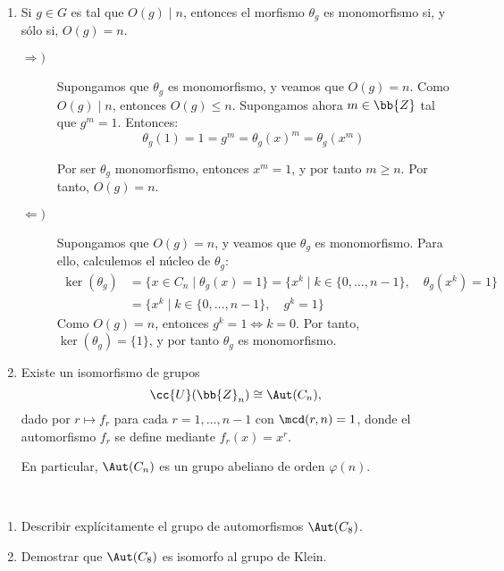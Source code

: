 \begin{ejercicio}
\begin{enumerate}
        \item Si $g \in G$ es tal que $O(g) \mid n$, entonces el morfismo $\theta_g$ es monomorfismo si, y sólo si, $O(g) = n$.
        \begin{description}
            \item[$\Longrightarrow)$] Supongamos que $\theta_g$ es monomorfismo, y veamos que $O(g)=n$. Como $O(g)\mid n$, entonces $O(g)\leq n$. Supongamos ahora $m\in \bb{Z}$ tal que $g^m=1$. Entonces:
            \begin{equation*}
                \theta_g(1)=1 =g^m=\theta_g(x)^m=\theta_g(x^m)
            \end{equation*}

            Por ser $\theta_g$ monomorfismo, entonces $x^m=1$, y por tanto $m\geq n$. Por tanto, $O(g)=n$.


            \item[$\Longleftarrow)$] Supongamos que $O(g)=n$, y veamos que $\theta_g$ es monomorfismo. Para ello, calculemos el núcleo de $\theta_g$:
            \begin{align*}
                \ker(\theta_g) &= \{x\in C_n\mid \theta_g(x)=1\}
                = \{x^k\mid k\in \{0,\ldots,n-1\},\quad \theta_g(x^k)=1\}\\
                &= \{x^k\mid k\in \{0,\ldots,n-1\},\quad g^k=1\}
            \end{align*}
            Como $O(g)=n$, entonces $g^k=1\iff k=0$. Por tanto, $\ker(\theta_g)=\{1\}$, y por tanto $\theta_g$ es monomorfismo.
        \end{description}
        
        \item Existe un isomorfismo de grupos
        \begin{equation*}
            \cc{U}(\bb{Z}_n) \cong \Aut(C_n),
        \end{equation*}
        dado por $r \mapsto f_r$ para cada $r = 1, \ldots, n-1$ con $\mcd(r, n) = 1$, donde el automorfismo $f_r$ se define mediante $f_r(x) = x^r$.

        En particular, $\Aut(C_n)$ es un grupo abeliano de orden $\varphi(n)$.


    \end{enumerate}
\end{ejercicio}

\begin{ejercicio}\label{ej:3.18}~
    \begin{enumerate}
        \item Describir explícitamente el grupo de automorfismos $\Aut(C_8)$.
        
        \item Demostrar que $\Aut(C_8)$ es isomorfo al grupo de Klein.
    \end{enumerate}
\end{ejercicio}